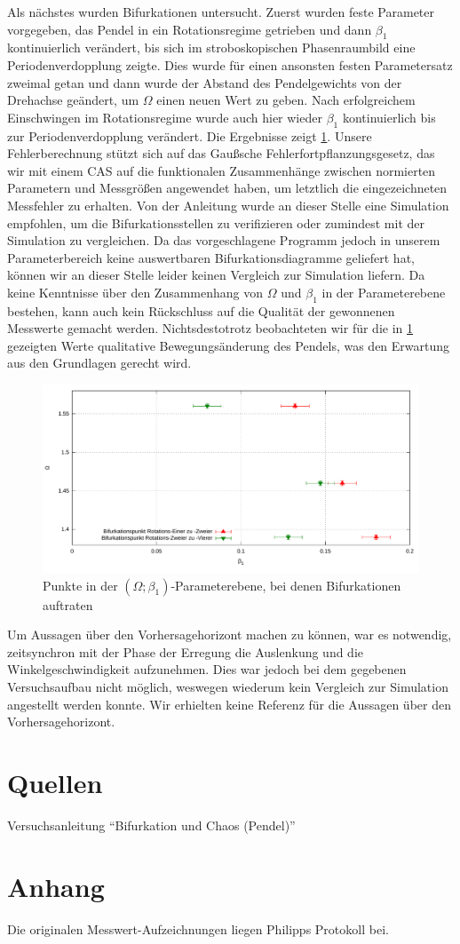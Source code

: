 \documentclass[numbers=noenddot,12pt,a4paper]{scrartcl}
\newcommand{\ix}[1]{_\text{#1}}
\begin{document}
Als nächstes wurden Bifurkationen untersucht. Zuerst wurden feste Parameter vorgegeben, das Pendel in ein Rotationsregime getrieben und dann $\beta\ix{1}$ kontinuierlich verändert, bis sich im stroboskopischen Phasenraumbild eine Periodenverdopplung zeigte. Dies wurde für einen ansonsten festen Parametersatz zweimal getan und dann wurde der Abstand des Pendelgewichts von der Drehachse geändert, um $\Omega$ einen neuen Wert zu geben. Nach erfolgreichem Einschwingen im Rotationsregime wurde auch hier wieder $\beta\ix{1}$ kontinuierlich bis zur Periodenverdopplung verändert. Die Ergebnisse zeigt \ref{img:beef}. Unsere Fehlerberechnung stützt sich auf das Gaußsche Fehlerfortpflanzungsgesetz, das wir mit einem CAS auf die funktionalen Zusammenhänge zwischen normierten Parametern und Messgrößen angewendet haben, um letztlich die eingezeichneten Messfehler zu erhalten. Von der Anleitung wurde an dieser Stelle eine Simulation empfohlen, um die Bifurkationsstellen zu verifizieren oder zumindest mit der Simulation zu vergleichen. Da das vorgeschlagene Programm jedoch in unserem Parameterbereich keine auswertbaren Bifurkationsdiagramme geliefert hat, können wir an dieser Stelle leider keinen Vergleich zur Simulation liefern. Da keine Kenntnisse über den Zusammenhang von $\Omega$ und $\beta\ix{1}$ in der Parameterebene bestehen, kann auch kein Rückschluss auf die Qualität der gewonnenen Messwerte gemacht werden. Nichtsdestotrotz beobachteten  wir für die in \ref{img:beef} gezeigten Werte qualitative Bewegungsänderung des Pendels, was den Erwartung aus den Grundlagen gerecht wird.
\begin{figure}[H]
	\includegraphics[width=\textwidth]{messwerte/beefurkation.pdf}
	\caption{Punkte in der $(\Omega;\beta\ix{1})$-Parameterebene, bei denen Bifurkationen auftraten}
	\label{img:beef}
\end{figure}
Um Aussagen über den Vorhersagehorizont machen zu können, war es notwendig, zeitsynchron mit der Phase der Erregung die Auslenkung und die Winkelgeschwindigkeit aufzunehmen. Dies war jedoch bei dem gegebenen Versuchsaufbau nicht möglich, weswegen wiederum kein Vergleich zur Simulation angestellt werden konnte. Wir erhielten keine Referenz für die Aussagen über den Vorhersagehorizont. 
\section{Quellen}
Versuchsanleitung "`Bifurkation und Chaos (Pendel)"'
\section{Anhang}
Die originalen Messwert-Aufzeichnungen liegen Philipps Protokoll bei.
\end{document}

